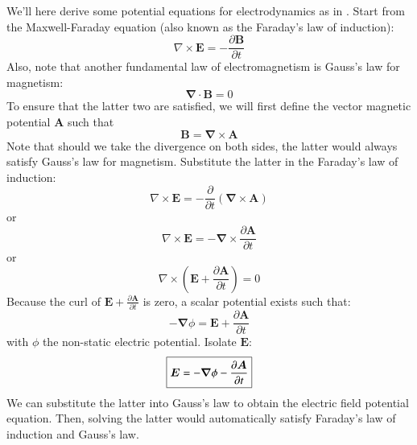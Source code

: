\documentclass{warpdoc}
\newcommand\frameeqn[1]{\fbox{$\displaystyle #1$}}
\renewcommand{\vec}[1]{\bm{#1}}
\begin{document}
We'll here derive some potential equations for electrodynamics as in \cite{book:2007:brown}.
Start from the Maxwell-Faraday equation (also known as the Faraday's law of induction):
%
\begin{equation}
 \nabla \times \vec{E} = -\frac{\partial \vec{B}}{\partial t}
 \label{eqn:faradaylaw}
\end{equation}
%
Also, note that another fundamental law of electromagnetism is Gauss's law for magnetism:
%
\begin{equation}
  \vec{\nabla} \cdot \vec{B}=0
  \label{eqn:gausslawmagnetism}
\end{equation}
%
To ensure that the latter two are satisfied, we will first define the vector magnetic potential $\vec{A}$ such that
%
\begin{equation}
 \vec{B}=\vec{\nabla} \times \vec{A}
 \label{eqn:magneticpotential}
\end{equation}
%
Note that should we take the divergence on both sides, the latter would always satisfy Gauss's law for magnetism.
Substitute the latter in the Faraday's law of induction:
%
\begin{equation}
 \nabla \times \vec{E} = -\frac{\partial}{\partial t}(\vec{\nabla} \times \vec{A})
\end{equation}
%
or
%
\begin{equation}
 \nabla \times \vec{E} = -\vec{\nabla} \times \frac{\partial \vec{A}}{\partial t} 
\end{equation}
%
or
%
\begin{equation}
 \nabla \times \left( \vec{E} + \frac{\partial \vec{A}}{\partial t} \right)= 0
\end{equation}
%
Because the curl of $\vec{E} + \frac{\partial \vec{A}}{\partial t}$ is zero, a scalar potential exists such that:
%
\begin{equation}
  -\vec{\nabla} \phi = \vec{E} + \frac{\partial \vec{A}}{\partial t}
\end{equation}
%
with $\phi$ the non-static electric potential.
Isolate $\vec{E}$:
%
\begin{equation}
\frameeqn{
\vec{E}=  -\vec{\nabla} \phi -\frac{\partial \vec{A}}{\partial t} 
}
\label{eqn:Bpotential:E}
\end{equation}
%
We can substitute the latter into Gauss's law to obtain the electric field potential equation. Then, solving the latter would automatically satisfy Faraday's law of induction and Gauss's law.
\end{document}

